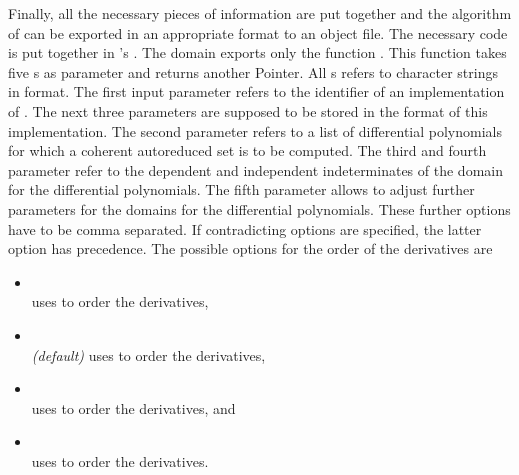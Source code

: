 Finally, all the necessary pieces of information are put together and the  algorithm of  can be exported in an appropriate format to an object file. The necessary code is put together in \LibCharSet's \adthistype. The domain exports only the function . This function takes five s as parameter and returns another Pointer. All s refers to character strings in \C format. The first input parameter refers to the identifier of an implementation of . The next three parameters are supposed to be stored in the format of this implementation. The second parameter refers to a list of differential polynomials for which a coherent autoreduced set is to be computed. The third and fourth parameter refer to the dependent and independent indeterminates of the domain for the differential polynomials. The fifth parameter allows to adjust further parameters for the domains for the differential polynomials. These further options have to be comma separated. If contradicting options are specified, the latter option has precedence. The possible options for the order of the derivatives are
\begin{itemize}
\item {} \\ uses  to order the derivatives,
\item {} \\ {\em(default)} uses  to order the derivatives,
\item {} \\ uses  to order the derivatives, and
\item {} \\ uses  to order the derivatives.
\end{itemize}

